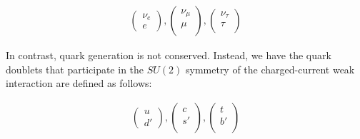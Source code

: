 \begin{equation} 
\begin{align*}
\label{eq:CKMMatrix}
        \begin{pmatrix}
        \nu_e \\
        e 
    \end{pmatrix}, 
    \begin{pmatrix}
         \nu_\mu \\
         \mu \\
    \end{pmatrix},
     \begin{pmatrix}
        \nu_\tau \\
        \tau \\
    \end{pmatrix}
\end{align*}
\end{equation}

In contrast, quark generation is not conserved. Instead, we have the quark doublets that participate in the $SU(2)$ symmetry of the charged-current weak interaction are defined as follows:

\begin{equation} 
\begin{align*}
\label{eq:CKMMatrix}
        \begin{pmatrix}
        u \\
        d' 
    \end{pmatrix}, 
    \begin{pmatrix}
         c \\
         s' \\
    \end{pmatrix},
     \begin{pmatrix}
        t \\
        b' \\
    \end{pmatrix}
\end{align*}
\end{equation}

